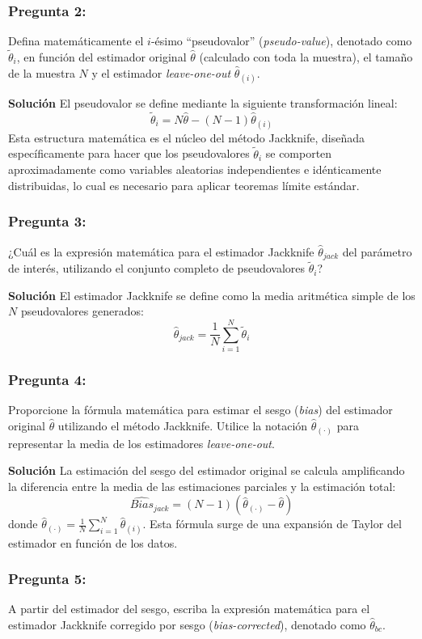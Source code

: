\documentclass[a4paper]{article}
\begin{document}
\subsubsection{Pregunta 2:} Defina matemáticamente el $i$-ésimo ``pseudovalor'' (\textit{pseudo-value}), denotado como $\tilde{\theta}_i$, en función del estimador original $\hat{\theta}$ (calculado con toda la muestra), el tamaño de la muestra $N$ y el estimador \textit{leave-one-out} $\hat{\theta}_{(i)}$.

\textbf{Solución}
El pseudovalor se define mediante la siguiente transformación lineal:
$$ \tilde{\theta}_i = N\hat{\theta} - (N-1)\hat{\theta}_{(i)} $$
Esta estructura matemática es el núcleo del método Jackknife, diseñada específicamente para hacer que los pseudovalores $\tilde{\theta}_i$ se comporten aproximadamente como variables aleatorias independientes e idénticamente distribuidas, lo cual es necesario para aplicar teoremas límite estándar.

\subsubsection{Pregunta 3:} ¿Cuál es la expresión matemática para el estimador Jackknife $\hat{\theta}_{jack}$ del parámetro de interés, utilizando el conjunto completo de pseudovalores $\tilde{\theta}_i$?

\textbf{Solución}
El estimador Jackknife se define como la media aritmética simple de los $N$ pseudovalores generados:
$$ \hat{\theta}_{jack} = \frac{1}{N} \sum_{i=1}^N \tilde{\theta}_i $$

\subsubsection{Pregunta 4:} Proporcione la fórmula matemática para estimar el sesgo (\textit{bias}) del estimador original $\hat{\theta}$ utilizando el método Jackknife. Utilice la notación $\hat{\theta}_{(\cdot)}$ para representar la media de los estimadores \textit{leave-one-out}.

\textbf{Solución}
La estimación del sesgo del estimador original se calcula amplificando la diferencia entre la media de las estimaciones parciales y la estimación total:
$$ \widehat{Bias}_{jack} = (N-1)(\hat{\theta}_{(\cdot)} - \hat{\theta}) $$
donde $\hat{\theta}_{(\cdot)} = \frac{1}{N} \sum_{i=1}^N \hat{\theta}_{(i)}$. Esta fórmula surge de una expansión de Taylor del estimador en función de los datos.

\subsubsection{Pregunta 5:} A partir del estimador del sesgo, escriba la expresión matemática para el estimador Jackknife corregido por sesgo (\textit{bias-corrected}), denotado como $\hat{\theta}_{bc}$.
\end{document}
